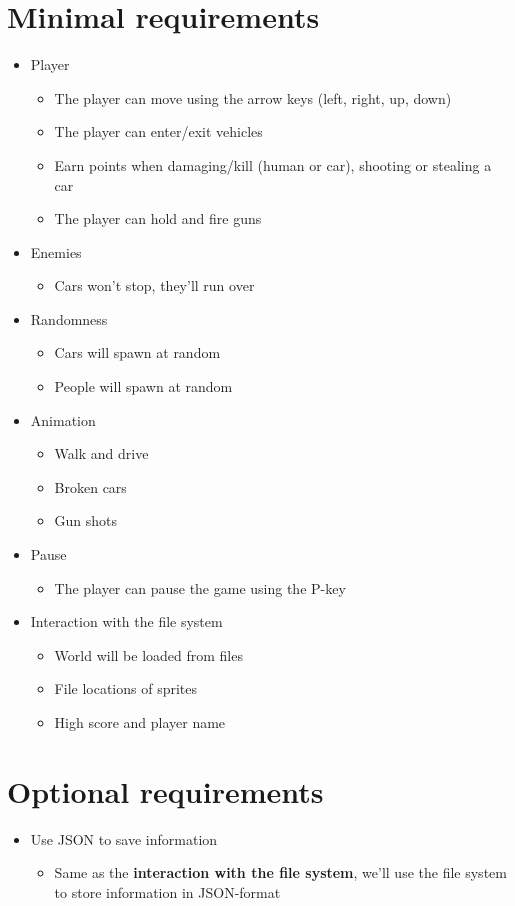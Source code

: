 \documentclass[12pt]{article}
\begin{document}
	\section{Minimal requirements}
	\begin{itemize}
		\item Player
			\begin{itemize}
				\item The player can move using the arrow keys (left, right, up, down)
				\item The player can enter/exit vehicles
				\item Earn points when damaging/kill (human or car), shooting or stealing a car
				\item The player can hold and fire guns
			\end{itemize}
		\item Enemies
			\begin{itemize}
				\item Cars won't stop, they'll run over
			\end{itemize}
		\item Randomness
			\begin{itemize}
				\item Cars will spawn at random
				\item People will spawn at random
			\end{itemize}
		\item Animation
			\begin{itemize}
				\item Walk and drive
				\item Broken cars
				\item Gun shots
			\end{itemize}
		\item Pause
			\begin{itemize}
				\item The player can pause the game using the P-key
			\end{itemize}
		\item Interaction with the file system
			\begin{itemize}
				\item World will be loaded from files
				\item File locations of sprites
				\item High score and player name
			\end{itemize}
	\end{itemize}

	\section{Optional requirements}
	\begin{itemize}
		\item Use JSON to save information
			\begin{itemize}
				\item Same as the \textbf{interaction with the file system}, we'll use the file system to store information in JSON-format
			\end{itemize}
	\end{itemize}
\end{document}

